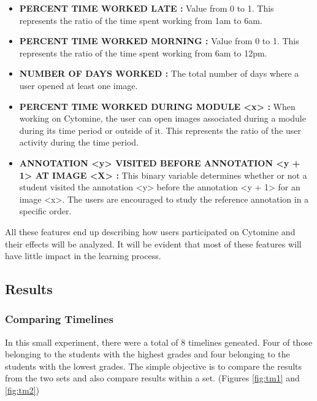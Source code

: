 \documentclass[a4paper,11pt]{report}
\numberwithin{figure}{section} %
\begin{document}
\begin{itemize}
    \item[\textbullet] \textbf{PERCENT TIME WORKED LATE :} Value from 0 to 1.
    This represents the ratio of the time spent working from 1am to 6am.
        
    \item[\textbullet] \textbf{PERCENT TIME WORKED MORNING :} Value from 0 to 1.
    This represents the ratio of the time spent working from 6am to 12pm.
    
    \item[\textbullet] \textbf{NUMBER OF DAYS WORKED :} The total number of days where a user opened at least one image.
    
    \item[\textbullet] \textbf{PERCENT TIME WORKED DURING MODULE <x> :} When working on Cytomine, the user can open images associated during a module during its time period or outside of it.
    This represents the ratio of the user activity during the time period.
    
	\item[\textbullet] \textbf{ANNOTATION <y> VISITED BEFORE ANNOTATION <y + 1> AT IMAGE <X> :} This binary variable determines whether or not a student visited the annotation <y> before the annotation <y + 1> for an image <x>.
	The users are encouraged to study the reference annotation in a specific order.
    
    \end{itemize}
    

    All these features end up describing how users participated on Cytomine and their effects will be analyzed.
    It will be evident that most of these features will have little impact in the learning process.
    
    \subsection{Results}

    \subsubsection{Comparing Timelines}

        In this small experiment, there were a total of 8 timelines geneated.
        Four of those belonging to the students with the highest grades and four belonging to the students with the lowest grades.
        The simple objective is to compare the results from the two sets and also compare results within a set. (Figures \ref{fig:tm1} and \ref{fig:tm2})
\end{document}
